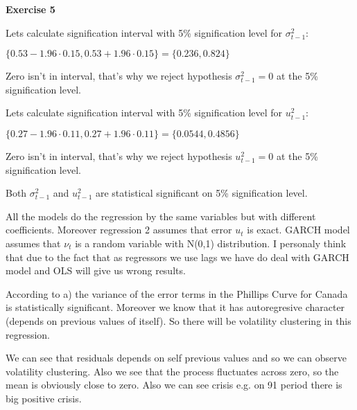 \documentclass[12pt]{article}
\begin{document}
\begin{list}{()~}{}
\bigskip
	
\textbf{Exercise 5}
\begin{list}{)~}{}	
\item
Lets calculate signification interval with 5\% signification level for $\sigma_{t-1}^2$:

$\{0.53-1.96\cdot 0.15, 0.53+1.96\cdot 0.15\}=\{0.236, 0.824\}$

Zero isn't in interval, that's why we reject hypothesis $\sigma_{t-1}^2=0$ at the 5\% signification level.

Lets calculate signification interval with 5\% signification level for $u_{t-1}^2$:

$\{0.27-1.96\cdot 0.11, 0.27+1.96\cdot 0.11\}=\{0.0544, 0.4856\}$

Zero isn't in interval, that's why we reject hypothesis $u_{t-1}^2=0$ at the 5\% signification level.

Both $\sigma_{t-1}^2$ and $u_{t-1}^2$ are statistical significant on 5\% signification level.

\item 
\item
All the models do the regression by the same variables but with different coefficients. Moreover regression 2 assumes that error $u_t$ is exact. GARCH model assumes that $\nu_t$ is a random variable with N(0,1) distribution. I personaly think that due to the fact that as regressors we use lags we have do deal with GARCH model and OLS will give us wrong results. 
\item
According to a) the variance of the error terms in the Phillips Curve for Canada is statistically significant. Moreover we know that it has autoregresive character (depends on previous values of itself). So there will be volatility clustering in this regression.
\item
We can see that residuals depends on self previous values and so we can observe volatility clustering. Also we see that the process fluctuates across zero, so the mean is obviously close to zero. Also we can see crisis e.g. on 91 period there is big positive crisis.  
\end{list}

\end{list}
\end{document}
